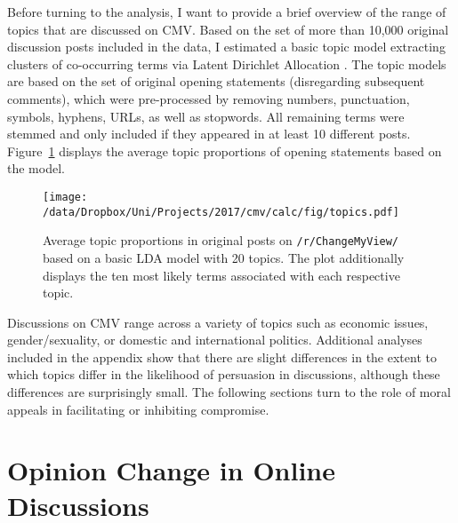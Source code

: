 
Before turning to the analysis, I want to provide a brief overview of the range of topics that are discussed on CMV. Based on the set of more than 10,000 original discussion posts included in the data, I estimated a basic topic model extracting clusters of co-occurring terms via Latent Dirichlet Allocation \citet{blei2003latent}. The topic models are based on the set of original opening statements (disregarding subsequent comments), which were pre-processed by removing numbers, punctuation, symbols, hyphens, URLs, as well as stopwords. All remaining terms were stemmed and only included if they appeared in at least 10 different posts. Figure~\ref{fig:lda} displays the average topic proportions of opening statements based on the model.

\begin{figure}[ht]
\centering
\texttt{[image: /data/Dropbox/Uni/Projects/2017/cmv/calc/fig/topics.pdf]}
\caption{Average topic proportions in original posts on \texttt{/r/ChangeMyView/} based on a basic LDA model with 20 topics. The plot additionally displays the ten most likely terms associated with each respective topic.}\label{fig:lda}
\end{figure}

Discussions on CMV range across a variety of topics such as economic issues, gender/sexuality, or domestic and international politics. Additional analyses included in the appendix show that there are slight differences in the extent to which topics differ in the likelihood of persuasion in discussions, although these differences are surprisingly small. The following sections turn to the role of moral appeals in facilitating or inhibiting compromise.



\section{Opinion Change in Online Discussions}


